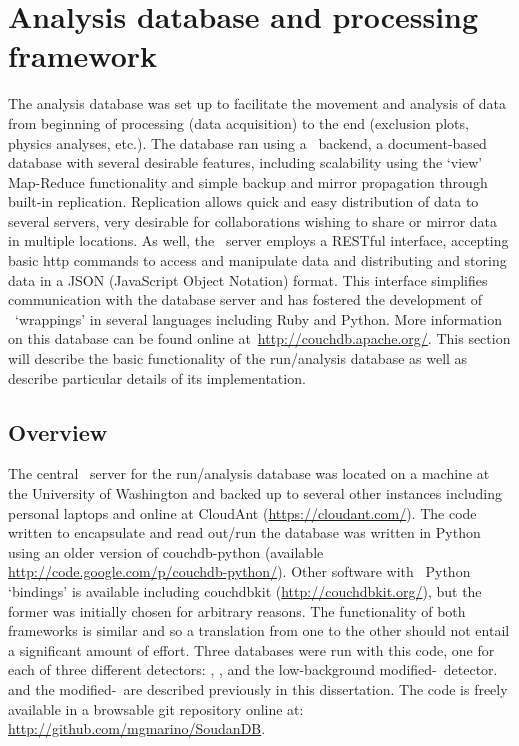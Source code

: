 	\section{Analysis database and processing framework}
	\label{sec:AnalysisDBProcFramework}
	The analysis database was set up to facilitate the movement and analysis of
data from beginning of processing (data acquisition) to the end (exclusion
plots, physics analyses, etc.).  The database ran using a \couchdb~backend, a
document-based database with several desirable features, including scalability
using the `view' Map-Reduce functionality and simple backup and mirror
propagation through built-in replication.  Replication allows quick and easy
distribution of data to several servers, very desirable for collaborations
wishing to share or mirror data in multiple locations.  As well, the \couchdb~server employs a RESTful interface, accepting basic http commands to access and
manipulate data and distributing and storing data in a JSON (JavaScript Object
Notation) format.  This interface simplifies communication with the database
server and has fostered the development of \couchdb~`wrappings' in several
languages including Ruby and Python.  More information on this database can be
found online at~\url{http://couchdb.apache.org/}.  This section will describe
the basic functionality of the run/analysis database as well as describe
particular details of its implementation.  

		\subsection{Overview}
		
	The central \couchdb~server for the run/analysis database was located on a
machine at the University of Washington and backed up to several other
instances including personal laptops and online at CloudAnt
(\url{https://cloudant.com/}).  The code written to encapsulate and read
out/run the database was written in Python using an older version of
couchdb-python (available \url{http://code.google.com/p/couchdb-python/}).
Other software with \couchdb~Python `bindings' is available including couchdbkit
(\url{http://couchdbkit.org/}), but the former was initially chosen for
arbitrary reasons.  The functionality of both frameworks is similar and so a
translation from one to the other should not entail a significant amount of
effort.  Three databases were run with this code, one for each of three
different detectors: , , and the low-background modified-\bege~detector.  
and the modified-\bege~are described previously in this dissertation.  The code is freely
available in a browsable git repository online at:
\url{http://github.com/mgmarino/SoudanDB}.  			

